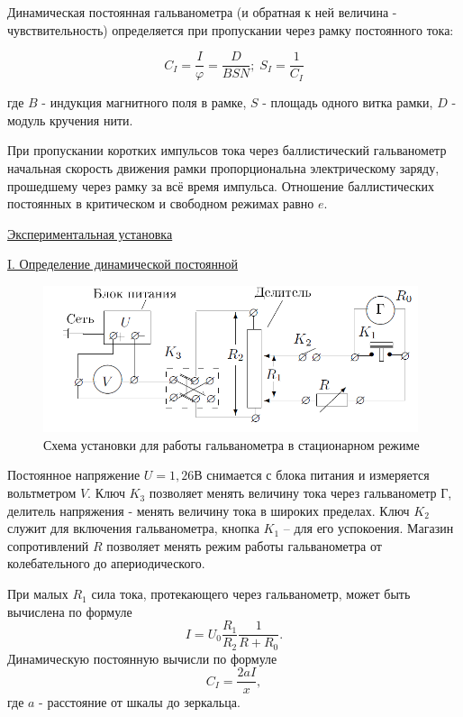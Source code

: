 \documentclass[a4paper]{article}
\begin{document}
Динамическая постоянная гальванометра (и обратная к ней величина - чувствительность) определяется при пропускании через рамку постоянного тока:

\begin{equation}
    C_{I} = \frac{I}{\varphi} = \frac{D}{BSN}; \; S_{I} = \frac{1}{C_{I}}
\end{equation}

где $B$ - индукция магнитного поля в рамке, $S$ - площадь одного витка рамки, $D$ - модуль кручения нити. \par
При пропускании коротких импульсов тока через баллистический гальванометр начальная скорость движения рамки пропорциональна электрическому заряду, прошедшему через рамку за всё время импульса. Отношение баллистических постоянных в критическом и свободном режимах равно $e$.

\newpage

\begin{center}
    \raggedleft
        \underline{\underline{\LARGE {Экспериментальная установка}}}
\end{center}

\begin{center}
    \underline{\large {\RN{1}. Определение динамической постоянной}}
\end{center}

\begin{figure}[h]
    \centering
    \includegraphics[width=11cm]{images/fig1.PNG}
    \caption{Схема установки для работы гальванометра в стационарном режиме}
    \label{fig:vac}
\end{figure}

Постоянное напряжение $U = 1,26$В снимается с блока питания и измеряется вольтметром $V$. Ключ $K_3$ позволяет менять величину тока через гальванометр Г, делитель напряжения - менять величину тока в широких пределах. Ключ $K_2$ служит для включения гальванометра, кнопка $K_1$ -- для его успокоения. Магазин сопротивлений $R$ позволяет менять режим работы гальванометра от колебательного до апериодического. \par
При малых $R_1$ сила тока, протекающего через гальванометр, может быть вычислена по формуле 
\begin{equation}
    I = U_0 \frac{R_1}{R_2} \frac{1}{R + R_0}.
\end{equation}
Динамическую постоянную вычисли по формуле 
\begin{equation}
    C_I = \frac{2aI}{x},
\end{equation}
где $a$ - расстояние от шкалы до зеркальца.
\end{document}
